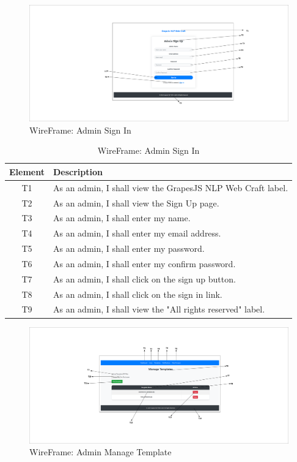 \documentclass[12pt]{report}
\begin{document}
\begin{figure}[ht]
    \centering
    \includegraphics[width=1\textwidth, trim=10cm 2cm 8cm 0cm, clip]{Media/4.pdf} %
    \caption{WireFrame: Admin Sign In}
    \label{fig:drawing1}
\end{figure}
 \begin{table}[h!]
    \centering
    \begin{tabular}{|c|p{10cm}|}
        \hline
        \textbf{Element} & \textbf{Description} \\
        \hline
        T1 & As an admin, I shall view the GrapesJS NLP Web Craft label. \\
        \hline
        T2 & As an admin, I shall view the Sign Up page. \\
        \hline
        T3 & As an admin, I shall enter my name. \\
        \hline
        T4 & As an admin, I shall enter my email address. \\
        \hline
        T5 & As an admin, I shall enter my password. \\
        \hline
        T6 & As an admin, I shall enter my confirm password. \\
        \hline
        T7 & As an admin, I shall click on the sign up button. \\
        \hline
        T8 & As an admin, I shall click on the sign in link. \\
        \hline
        T9 & As an admin, I shall view the "All rights reserved" label. \\
        \hline
    \end{tabular}
    \caption{WireFrame: Admin Sign In}
    \label{tab:admin_signup_actions}
\end{table}
\begin{figure}[ht]
    \centering
    \includegraphics[width=1\textwidth, trim=10cm 4cm 10cm 4cm, clip]{Media/5.pdf} %
    \caption{WireFrame: Admin Manage Template}
    \label{fig:drawing1}
\end{figure} 
\end{document}
